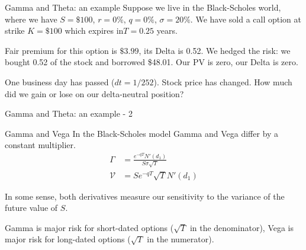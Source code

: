 \documentclass{beamer}
\begin{document}
\begin{frame}{Gamma and Theta: an example}
\justify
Suppose we live in the Black-Scholes world, where we have $S=\$100$, $r=0\%$, $q=0\%$, $\sigma=20\%$. We have \alert{sold} a call option at strike $K=\$100$ which expires in$T=0.25$  years.

\justify
Fair premium for this option is $\$3.99$, its Delta is 0.52. We hedged the risk: we bought 0.52 of the stock and borrowed \$48.01. Our PV is zero, our Delta is zero.

\justify
One business day has passed ($dt = 1/252$). Stock price has changed. How much did we gain or lose on our delta-neutral position?
\end{frame}



\begin{frame}{Gamma and Theta: an example - 2}
\centering
{}
\end{frame}



\begin{frame}{Gamma and Vega}
\justify
In the Black-Scholes model Gamma and Vega differ by a constant multiplier.
\begin{align*}
\Gamma &= \frac{e^{-qT}N'(d_1)}{S\sigma\sqrt{T}} \\
\mathcal{V} &= Se^{-qT}\sqrt{T}N'(d_1)
\end{align*}

\justify
In some sense, both derivatives measure our sensitivity to the variance of the future value of $S$.

\justify
Gamma is major risk for short-dated options ($\sqrt{T}$ in the denominator), Vega is major risk for long-dated options ($\sqrt{T}$ in the numerator). 
\end{frame}
\end{document}
